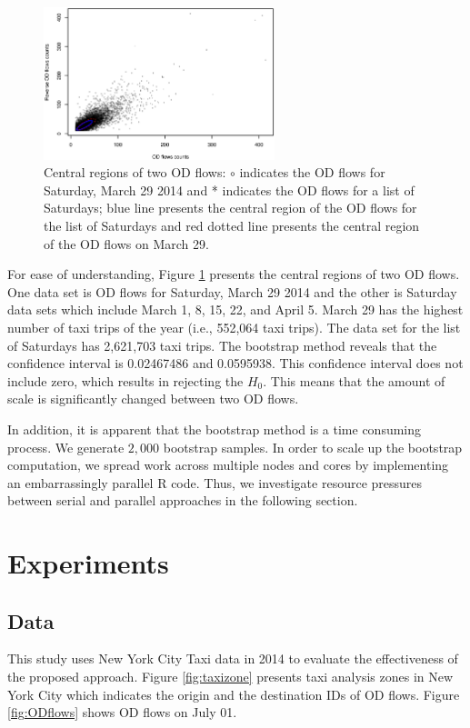 \documentclass[a4paper,UKenglish]{lipics-v2016}
\begin{document}
\begin{figure}
	\centering
	\includegraphics[width=0.6\textwidth]{images/com_mar_0329.eps}
	\caption{Central regions of two OD flows: $\circ$ indicates the OD flows for Saturday, March 29 2014 and * indicates the OD flows for a list of Saturdays; blue line presents the central region of the OD flows for the list of Saturdays and red dotted line presents the central region of the OD flows on March 29.}
	\label{fig:com_mar_0329}	
\end{figure}

For ease of understanding, Figure \ref{fig:com_mar_0329} presents the central regions of two OD flows.
One data set is OD flows for Saturday, March 29 2014 and the other is Saturday data sets which include March  1, 8, 15, 22, and April 5.
March 29 has the highest number of taxi trips of the year (i.e., 552,064 taxi trips).
The data set for the list of Saturdays has 2,621,703 taxi trips. The bootstrap method reveals that the confidence interval is 0.02467486 and 0.0595938. This confidence interval does not include zero, which results in rejecting the $H_0$. 
This means that the amount of scale is significantly changed between two OD flows. 

In addition, it is apparent that the bootstrap method is a time consuming process.
We generate $2,000$ bootstrap samples. In order to scale up the bootstrap computation, we spread work across multiple nodes and cores by implementing an embarrassingly parallel R code.  Thus, we investigate resource pressures between serial and parallel approaches in the following section.

\section{Experiments}
\label{sec:experiments}

\subsection{Data}
This study uses New York City Taxi data in 2014 to evaluate the effectiveness of the proposed approach.
Figure \ref{fig:taxizone} presents taxi analysis zones in New York City which indicates the origin and the destination IDs of OD flows. Figure \ref{fig:ODflows} shows OD flows on July 01. 
\end{document}
